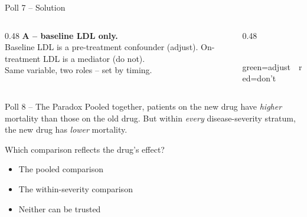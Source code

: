 \documentclass[aspectratio=169]{beamer}
\begin{document}
\begin{frame}{Poll 7 \;--\; Solution}
  \small
  \begin{columns}[T]
    \begin{column}{0.48\textwidth}
      \textcolor{good}{\textbf{A -- baseline LDL only.}}\\[0.4em]
      \textcolor{good}{Baseline LDL} is a pre-treatment confounder (adjust).
      \textcolor{brick}{On-treatment LDL} is a mediator (do not).\\[0.3em]
      Same variable, two roles -- set by timing.
    \end{column}
    \begin{column}{0.48\textwidth}
      \centering
      \\[0.2em]
      {\scriptsize\textcolor{good}{green=adjust}\ \ \textcolor{brick}{red=don't}}
    \end{column}
  \end{columns}
\end{frame}

\begin{frame}{Poll 8 \;--\; The Paradox}
  \small
  Pooled together, patients on the new drug have \emph{higher} mortality than
  those on the old drug. But within \emph{every} disease-severity stratum, the
  new drug has \emph{lower} mortality.
  \vspace{0.8em}

  Which comparison reflects the drug's effect?
  \begin{itemize}
    \item[\textbf{A.}] The pooled comparison
    \item[\textbf{B.}] The within-severity comparison
    \item[\textbf{C.}] Neither can be trusted
  \end{itemize}
\end{frame}
\end{document}
